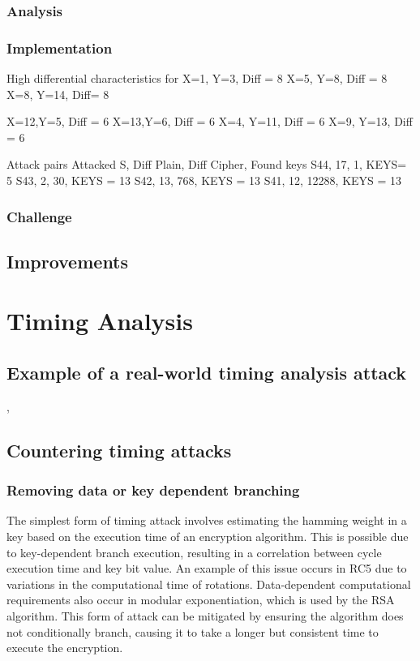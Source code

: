 \documentclass[british,11pt,a4paper]{article}
\begin{document}
\subsubsection{Analysis}

\subsubsection{Implementation}
High differential characteristics for
X=1, Y=3, Diff = 8
X=5, Y=8, Diff = 8
X=8, Y=14, Diff= 8

X=12,Y=5, Diff = 6
X=13,Y=6, Diff = 6
X=4, Y=11, Diff = 6
X=9, Y=13, Diff = 6

Attack pairs
Attacked S, Diff Plain, Diff Cipher, Found keys
S44, 17, 1, KEYS= 5
S43, 2, 30, KEYS = 13
S42, 13, 768, KEYS = 13
S41, 12, 12288, KEYS = 13
\subsubsection{Challenge}

\subsection{Improvements}

\clearpage
\section{Timing Analysis}
\subsection{Example of a real-world timing analysis attack}
\cite{Kopf2009-mh},
\subsection{Countering timing attacks}

\subsubsection{Removing data or key dependent branching}
The simplest form of timing attack involves estimating the hamming weight in a key
based on the execution time of an encryption algorithm. This is possible due to
key-dependent branch execution, resulting in a correlation between cycle execution time
and key bit value. An example of this issue occurs in RC5
\cite{Handschuh1999} due to variations in the computational time of rotations.
Data-dependent computational requirements also occur in modular exponentiation, which is used by the RSA algorithm.
This form of attack can be mitigated by ensuring the algorithm does not conditionally branch,
causing it to take a longer but consistent time to execute the encryption.
\end{document}
